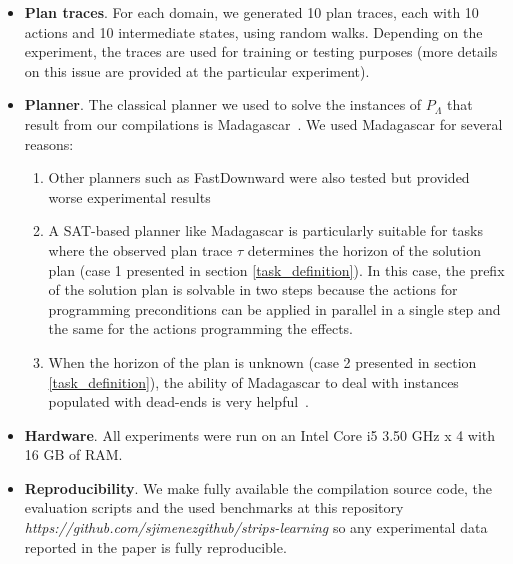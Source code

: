 \begin{itemize}
\item {\bf Plan traces}. For each domain, we generated 10 plan traces, each with 10 actions and 10 intermediate states, using random walks. Depending on the experiment, the traces are used for training or testing purposes (more details on this issue are provided at the particular experiment).

\item {\bf Planner}. The classical planner we used to solve the instances of $P_\Lambda$ that result from our compilations is {\sc Madagascar}~\cite{rintanen2014madagascar}. We used {\sc Madagascar} for several reasons:

  \begin{enumerate}
  \item \textcolor[rgb]{1.00,0.00,0.00}{Other planners such as {\sc FastDownward} were also tested but provided worse experimental results}
  \item \textcolor[rgb]{1.00,0.00,0.00}{A SAT-based planner like {\sc Madagascar} is particularly suitable for tasks where the observed plan trace $\tau$ determines the horizon of the solution plan (case 1 presented in section \ref{task_definition})}. In this case, the prefix of the solution plan is solvable in two steps because the actions for programming preconditions can be applied in parallel in a single step and the same for the actions programming the effects.
  \item \textcolor[rgb]{1.00,0.00,0.00}{When the horizon of the plan is unknown (case 2 presented in section \ref{task_definition}), the ability of {\sc Madagascar} to deal with instances populated with dead-ends is very helpful~\cite{lopez2015deterministic}.}
  \end{enumerate}

\item {\bf Hardware}. All experiments were run on an Intel Core i5 3.50 GHz x 4 with 16 GB of RAM.

\item {\bf Reproducibility}. We make fully available the compilation source code, the evaluation scripts and the used benchmarks at this repository {\em https://github.com/sjimenezgithub/strips-learning} so any experimental data reported in the paper is fully reproducible.
\end{itemize}

